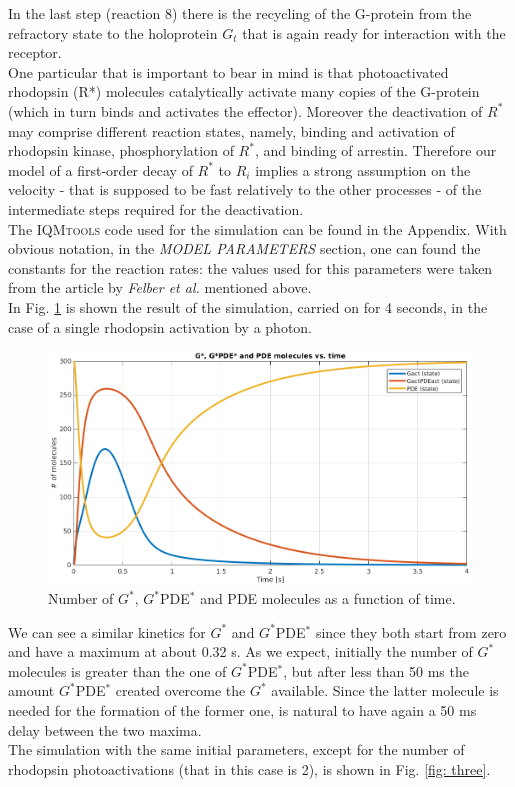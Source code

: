 \documentclass[pdf, color,12pt]{CITnote}
\begin{document}
In the last step (reaction 8) there is the recycling of the G-protein from the refractory state to the holoprotein $G_t$ that is again ready for interaction with the receptor.
\\ One particular that is important to bear in mind is that photoactivated rhodopsin (R*) molecules catalytically activate many copies of the G-protein (which in turn binds and activates the effector). Moreover the deactivation of $R^*$ may comprise different reaction states, namely, binding and activation of rhodopsin kinase, phosphorylation of $R^*$, and binding of arrestin. Therefore our model of a
first-order decay of $R^*$ to $R_i$ implies a strong assumption on the velocity - that is supposed to be fast relatively to the other processes - of the intermediate steps required for the deactivation.
\\ The \textsc{IQMtools} code used for the simulation can be found in the Appendix. With obvious notation, in the \textit{MODEL PARAMETERS} section, one can found the constants for the reaction rates: the values used for this parameters were taken from the article by \textit{Felber et al.} mentioned above.
\\ In Fig.$ $ \ref{fig: two} is shown the result of the simulation, carried on for 4 seconds, in the case of a single rhodopsin activation by a photon.
\begin{figure}[ht!]
\centering
\centerline{\includegraphics[scale=0.375]{prima.png}}
\caption{\small{Number of $G^*$, $G^*$PDE$^*$ and PDE molecules as a function of time.}}
\label{fig: two}
\end{figure}
We can see a similar kinetics for $G^*$ and $G^*$PDE$^*$ since they both start from zero and have a maximum at about 0.32 s. As we expect, initially the number of $G^*$ molecules is greater than the one of $G^*$PDE$^*$, but after less than 50 ms the amount $G^*$PDE$^*$ created overcome the $G^*$ available. Since the latter molecule is needed for the formation of the former one, is natural to have again a 50 ms delay between the two maxima.  
\\ The simulation with the same initial parameters, except for the number of rhodopsin photoactivations (that in this case is 2), is shown in Fig.$ $ \ref{fig: three}.
\end{document}
